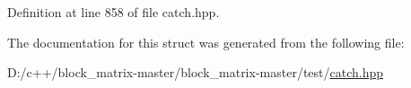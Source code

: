 Definition at line 858 of file catch.\+hpp.



The documentation for this struct was generated from the following file\+:\begin{DoxyCompactItemize}
\item 
D\+:/c++/block\+\_\+matrix-\/master/block\+\_\+matrix-\/master/test/\mbox{\hyperlink{catch_8hpp}{catch.\+hpp}}\end{DoxyCompactItemize}

